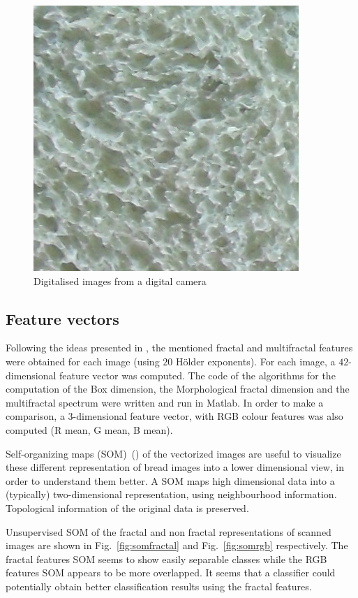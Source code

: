 \documentclass[oneside,a4paper,english,links]{amca}
\begin{document}
\begin{figure}[htb]
\includegraphics[scale=0.28]{imagenes/camera/Sa14}
\caption{Digitalised images from a digital camera}
\label{fig:camera}
\end{figure}

\subsection{Feature vectors}

Following the ideas presented in \cite{Gonzales2008}, the mentioned fractal and multifractal features were obtained for each image (using $20$ H\"older exponents). For each image, a $42$-dimensional feature vector was computed. The code of the algorithms for the computation of the Box dimension, the Morphological fractal dimension and the multifractal spectrum were written and run in Matlab. In order to make a comparison, a $3$-dimensional feature vector, with RGB colour features was also computed (R mean, G mean, B mean).

Self-organizing maps (SOM)~(\cite{Kohonen2001}) of the vectorized images are useful to visualize these different representation of bread images into a lower dimensional view, in order to understand them better. A SOM maps high dimensional data into a (typically) two-dimensional representation, using neighbourhood information. Topological information of the original data is preserved.  

Unsupervised SOM of the fractal and non fractal representations of scanned images are shown in Fig.~\ref{fig:somfractal} and Fig.~\ref{fig:somrgb} respectively. The fractal features SOM seems to show easily separable classes while the RGB features SOM appears to be more overlapped. It seems that a classifier could potentially obtain better classification results using the fractal features. %
\end{document}
